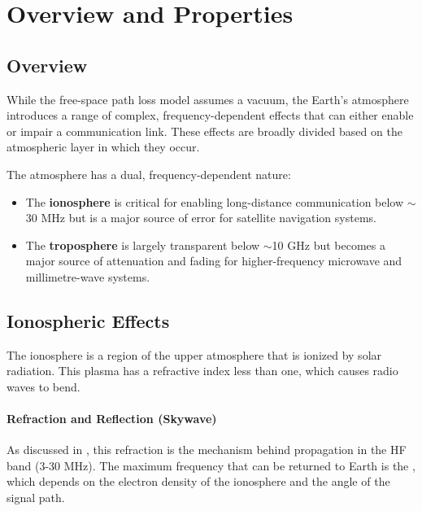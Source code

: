 \section{Overview and Properties}

\subsection{Overview}

While the free-space path loss model assumes a vacuum, the Earth's atmosphere introduces a range of complex, frequency-dependent effects that can either enable or impair a communication link. These effects are broadly divided based on the atmospheric layer in which they occur.

\begin{keyconcept}
    The atmosphere has a dual, frequency-dependent nature:
    \begin{itemize}
        \item The \textbf{ionosphere} is critical for enabling long-distance communication below $\sim$30 MHz but is a major source of error for satellite navigation systems.
        \item The \textbf{troposphere} is largely transparent below $\sim$10 GHz but becomes a major source of attenuation and fading for higher-frequency microwave and millimetre-wave systems.
    \end{itemize}
\end{keyconcept}


\subsection{Ionospheric Effects}

The ionosphere is a region of the upper atmosphere that is ionized by solar radiation. This plasma has a refractive index less than one, which causes radio waves to bend.

\paragraph{Refraction and Reflection (Skywave)}
As discussed in , this refraction is the mechanism behind  propagation in the HF band (3-30 MHz). The maximum frequency that can be returned to Earth is the , which depends on the electron density of the ionosphere and the angle of the signal path.

